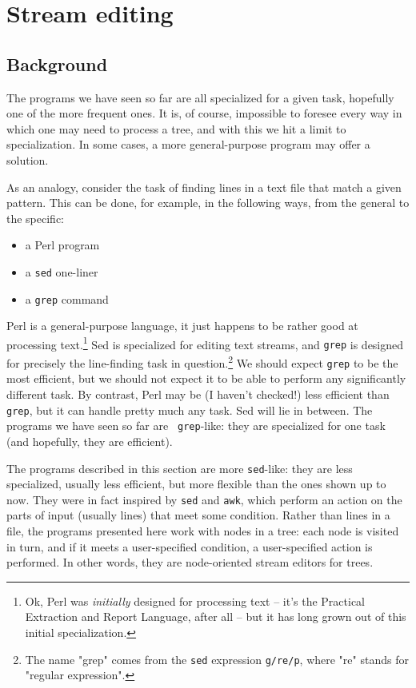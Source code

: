 \section{Stream editing}
\label{sct_ed}

\subsection{Background}

The programs we have seen so far are all specialized for a given task,
hopefully one of the more frequent ones. It is, of course, impossible to
foresee every way in which one may need to process a tree, and with this we hit
a limit to specialization. In some cases, a more general-purpose program may
offer a solution.

As an analogy, consider the task of finding lines in a text file that match a
given pattern. This can be done, for example, in the following ways, from the
general to the specific:
\begin{itemize}
	\item a Perl program
	\item a {\tt sed} one-liner
	\item a {\tt grep} command
\end{itemize}
Perl is a general-purpose language, it just happens to be rather good at
processing text.\footnote{Ok, Perl was \emph{initially} designed for processing
text -- it's the Practical Extraction and Report Language, after all -- but it
has long grown out of this initial specialization.} Sed is specialized for
editing text streams, and {\tt grep} is designed for precisely the line-finding
task in question.\footnote{The name "grep" comes from the {\tt sed} expression
{\tt g/re/p}, where "re" stands for "regular expression".} We should expect
{\tt grep} to be the most efficient, but we should not expect it to be able to
perform any significantly different task.  By contrast, Perl may be (I haven't
checked!) less efficient than {\tt grep}, but it can handle pretty much any
task. Sed will lie in between. The programs we have seen so far are {\tt
grep}-like: they are specialized for one task (and hopefully, they are
efficient).

The programs described in this section are more {\tt sed}-like: they are less
specialized, usually less efficient, but more flexible than the ones shown up to
now. They were in fact inspired by \texttt{sed} and \texttt{awk}, which perform
an action on the parts of input (usually lines) that meet some condition. Rather
than lines in a file, the programs presented here work with nodes in a tree:
each node is visited in turn, and if it meets a user-specified condition, a
user-specified action is performed. In other words, they are node-oriented
stream editors for trees.

